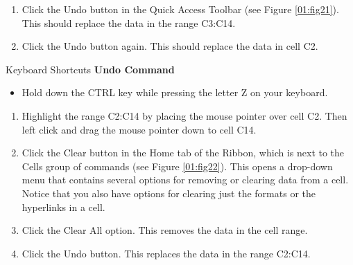 \begin{enumerate}
	\item Click the Undo button in the Quick Access Toolbar (see Figure \ref{01:fig21}). This should replace the data in the range \textsf{C3:C14}.
	\item Click the Undo button again. This should replace the data in cell \textsf{C2}.
\end{enumerate}

\begin{center}
	\begin{shtcutbox}{Keyboard Shortcuts}
		\textbf{Undo Command}
		\\
		\begin{itemize}
			\setlength{\itemsep}{0pt}
			\setlength{\parskip}{0pt}
			\setlength{\parsep}{0pt}
			
			\item Hold down the CTRL key while pressing the letter Z on your keyboard.
			
		\end{itemize}
	\end{shtcutbox}
\end{center}

\begin{enumerate}[resume]
	\item Highlight the range \textsf{C2:C14} by placing the mouse pointer over cell \textsf{C2}. Then left click and drag the mouse pointer down to cell \textsf{C14}.
	\item Click the Clear button in the Home tab of the Ribbon, which is next to the Cells group of commands (see Figure \ref{01:fig22}). This opens a drop-down menu that contains several options for removing or clearing data from a cell. Notice that you also have options for clearing just the formats or the hyperlinks in a cell.
	\item Click the Clear All option. This removes the data in the cell range.
	\item Click the Undo button. This replaces the data in the range \textsf{C2:C14}.
\end{enumerate}

